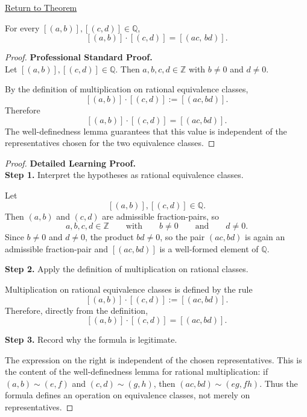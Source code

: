 \newpage
{}
\label{prf:ec-multiplication}

\begin{remark*}[Return]
\hyperref[thm:ec-multiplication]{Return to Theorem}
\end{remark*}

\begin{theorem*}
For every $[(a,b)],[(c,d)]\in\mathbb{Q}$,
\[
[(a,b)]\cdot[(c,d)] = [(ac,\,bd)].
\]
\end{theorem*}

\begin{proof}
\textbf{Professional Standard Proof.}~\\
Let $[(a,b)],[(c,d)]\in\mathbb{Q}$. Then $a,b,c,d\in\mathbb{Z}$ with
$b\neq 0$ and $d\neq 0$.

By the definition of multiplication on rational equivalence classes,
\[
[(a,b)]\cdot[(c,d)] := [(ac,bd)].
\]
Therefore
\[
[(a,b)]\cdot[(c,d)] = [(ac,bd)].
\]
The well-definedness lemma guarantees that this value is independent of
the representatives chosen for the two equivalence classes.
\end{proof}

\begin{proof}
\textbf{Detailed Learning Proof.}~\\

\textbf{Step 1.} Interpret the hypotheses as rational equivalence classes.

Let
\[
[(a,b)],[(c,d)]\in\mathbb{Q}.
\]
Then $(a,b)$ and $(c,d)$ are admissible fraction-pairs, so
\[
a,b,c,d\in\mathbb{Z}
\qquad\text{with}\qquad
b\neq 0
\qquad\text{and}\qquad
d\neq 0.
\]
Since $b\neq 0$ and $d\neq 0$, the product $bd\neq 0$, so the pair
$(ac,bd)$ is again an admissible fraction-pair and $[(ac,bd)]$ is a
well-formed element of $\mathbb{Q}$.

\textbf{Step 2.} Apply the definition of multiplication on rational classes.

Multiplication on rational equivalence classes is defined by the rule
\[
[(a,b)]\cdot[(c,d)] := [(ac,bd)].
\]
Therefore, directly from the definition,
\[
[(a,b)]\cdot[(c,d)] = [(ac,bd)].
\]

\textbf{Step 3.} Record why the formula is legitimate.

The expression on the right is independent of the chosen representatives.
This is the content of the well-definedness lemma for rational
multiplication: if $(a,b)\sim(e,f)$ and $(c,d)\sim(g,h)$, then
$(ac,bd)\sim(eg,fh)$. Thus the formula defines an operation on
equivalence classes, not merely on representatives.
\end{proof}

